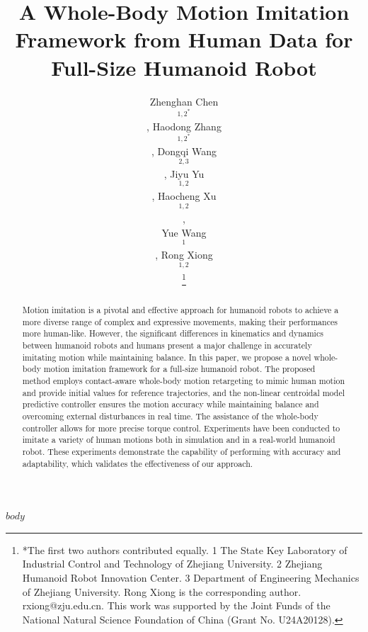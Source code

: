\documentclass[a4paper, 10pt, conference]{ieeeconf}
\title{\LARGE \bf
A Whole-Body Motion Imitation Framework from Human Data for Full-Size Humanoid Robot
}
\author{Zhenghan Chen$$^{1,2^*} $$, Haodong Zhang$$^{1,2^*}$$, Dongqi Wang$$^{2,3}$$, Jiyu Yu$$^{1,2}$$, Haocheng Xu$$^{1,2}$$, \\ Yue Wang$$^{1}$$, Rong Xiong$$^{1,2}$$ 
\thanks{*The first two authors contributed equally. 1 The State Key Laboratory of Industrial Control and Technology of Zhejiang University. 2 Zhejiang Humanoid Robot Innovation Center. 3 Department of Engineering Mechanics of Zhejiang University. Rong Xiong is the corresponding author. rxiong@zju.edu.cn. This work was supported by the Joint Funds of the National Natural Science Foundation of China (Grant No. U24A20128).}
}
\begin{document}
\maketitle
\thispagestyle{empty}
\pagestyle{empty}


\begin{abstract}

Motion imitation is a pivotal and effective approach for humanoid robots to achieve a more diverse range of complex and expressive movements, making their performances more human-like. However, the significant differences in kinematics and dynamics between humanoid robots and humans present a major challenge in accurately imitating motion while maintaining balance. In this paper, we propose a novel whole-body motion imitation framework for a full-size humanoid robot. The proposed method employs contact-aware whole-body motion retargeting to mimic human motion and provide initial values for reference trajectories, and the non-linear centroidal model predictive controller ensures the motion accuracy while maintaining balance and overcoming external disturbances in real time. The assistance of the whole-body controller allows for more precise torque control. Experiments have been conducted to imitate a variety of human motions both in simulation and in a real-world humanoid robot. These experiments demonstrate the capability of performing with accuracy and adaptability, which validates the effectiveness of our approach.


\end{abstract}
$body$

\end{document}
